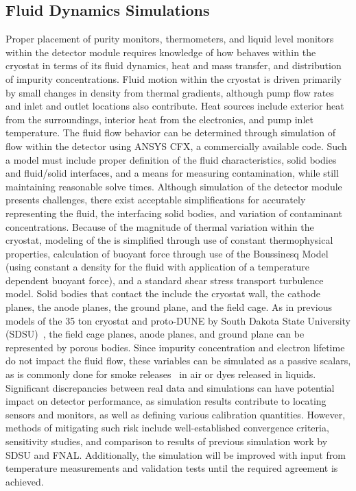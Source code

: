 \subsection{Fluid Dynamics Simulations}
\label{sec:fdgen-slow-cryo-cfd}

Proper placement of purity monitors, thermometers, and liquid level monitors within the detector module requires knowledge of how  behaves within the cryostat in terms of its fluid dynamics, heat and mass transfer, and distribution of impurity concentrations. 
Fluid motion within the cryostat is driven primarily by small changes in density from thermal gradients, although pump flow rates and inlet and outlet locations also contribute. 
Heat sources include exterior heat from the surroundings, interior heat from the electronics, and pump inlet temperature. 
The fluid flow behavior can be determined through simulation of  flow within the detector using ANSYS CFX, a commercially available  code. Such a model must include proper definition of the fluid characteristics, solid bodies and fluid/solid interfaces, and a means for measuring contamination, while still maintaining reasonable solve times.
Although simulation of the detector module presents challenges, there exist acceptable simplifications for accurately representing the fluid, the interfacing solid bodies, and variation of contaminant concentrations. Because of the magnitude of thermal variation within the cryostat, modeling of the  is simplified through use of constant thermophysical properties, calculation of buoyant force through use of the Boussinesq Model (using constant a density for the fluid with application of a temperature dependent buoyant force), and a standard shear stress transport turbulence model. Solid bodies that contact the  include the cryostat wall, the cathode planes, the anode planes, the ground plane, and the field cage. As in previous  models of the 35 ton cryostat and proto-DUNE by South Dakota State University (SDSU)~\cite{docdb-5915}, the field cage planes, anode planes, and ground plane can be represented by porous bodies. Since impurity concentration and electron lifetime do not impact the fluid flow, these variables can be simulated as a passive scalars, as is commonly done for smoke releases~\cite{cfd-1} in air or dyes released in liquids.
Significant discrepancies between real data and simulations can have potential impact on detector performance, as simulation results contribute to locating sensors and monitors, as well as defining various calibration quantities. However, methods of mitigating such risk include well-established convergence criteria, sensitivity studies, and comparison to results of previous  simulation work by SDSU and FNAL. Additionally, the simulation will be improved with input from temperature measurements and validation tests until the required agreement is achieved.

